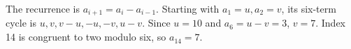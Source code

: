 The recurrence is $a_{i+1}=a_i-a_{i-1}$. Starting with $a_1=u,a_2=v$, its six-term cycle is $u,v,v-u,-u,-v,u-v$. Since $u=10$ and $a_6=u-v=3$, $v=7$. Index 14 is congruent to two modulo six, so $\boxed{a_{14}=7}$.
